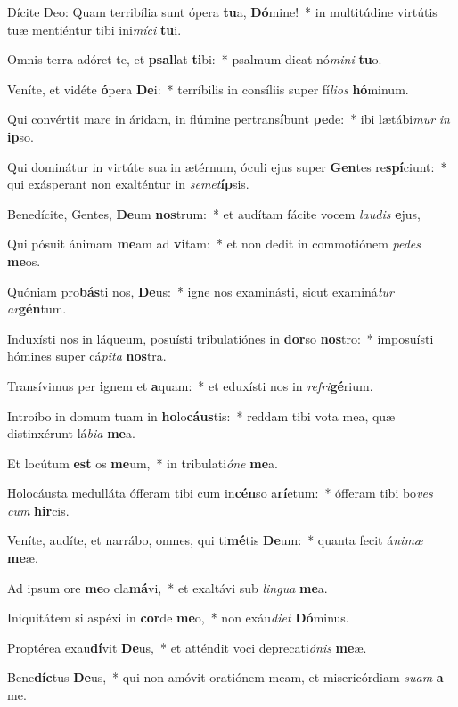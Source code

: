 \item Dícite Deo: Quam terribília sunt ópera \textbf{tu}a, \textbf{Dó}mine!~* in multitúdine virtútis tuæ mentiéntur tibi ini\textit{mí}\textit{ci} \textbf{tu}i.
\item Omnis terra adóret te, et \textbf{psal}lat \textbf{ti}bi:~* psalmum dicat nó\textit{mi}\textit{ni} \textbf{tu}o.
\item Veníte, et vidéte \textbf{ó}pera \textbf{De}i:~* terríbilis in consíliis super fí\textit{li}\textit{os} \textbf{hó}minum.
\item Qui convértit mare in áridam, in flúmine pertrans\textbf{í}bunt \textbf{pe}de:~* ibi lætábi\textit{mur} \textit{in} \textbf{ip}so.
\item Qui dominátur in virtúte sua in ætérnum, óculi ejus super \textbf{Gen}tes re\textbf{spí}ciunt:~* qui exásperant non exalténtur in \textit{se}\textit{met}\textbf{íp}sis.
\item Benedícite, Gentes, \textbf{De}um \textbf{nos}trum:~* et audítam fácite vocem \textit{lau}\textit{dis} \textbf{e}jus,
\item Qui pósuit ánimam \textbf{me}am ad \textbf{vi}tam:~* et non dedit in commotiónem \textit{pe}\textit{des} \textbf{me}os.
\item Quóniam pro\textbf{bás}ti nos, \textbf{De}us:~* igne nos examinásti, sicut examiná\textit{tur} \textit{ar}\textbf{gén}tum.
\item Induxísti nos in láqueum, posuísti tribulatiónes in \textbf{dor}so \textbf{nos}tro:~* imposuísti hómines super cá\textit{pi}\textit{ta} \textbf{nos}tra.
\item Transívimus per \textbf{i}gnem et \textbf{a}quam:~* et eduxísti nos in \textit{re}\textit{fri}\textbf{gé}rium.
\item Introíbo in domum tuam in \textbf{ho}lo\textbf{cáus}tis:~* reddam tibi vota mea, quæ distinxérunt lá\textit{bi}\textit{a} \textbf{me}a.
\item Et locútum \textbf{est} os \textbf{me}um,~* in tribulati\textit{ó}\textit{ne} \textbf{me}a.
\item Holocáusta medulláta ófferam tibi cum in\textbf{cén}so a\textbf{rí}etum:~* ófferam tibi bo\textit{ves} \textit{cum} \textbf{hir}cis.
\item Veníte, audíte, et narrábo, omnes, qui ti\textbf{mé}tis \textbf{De}um:~* quanta fecit á\textit{ni}\textit{mæ} \textbf{me}æ.
\item Ad ipsum ore \textbf{me}o cla\textbf{má}vi,~* et exaltávi sub \textit{lin}\textit{gua} \textbf{me}a.
\item Iniquitátem si aspéxi in \textbf{cor}de \textbf{me}o,~* non exáu\textit{di}\textit{et} \textbf{Dó}minus.
\item Proptérea exau\textbf{dí}vit \textbf{De}us,~* et atténdit voci deprecati\textit{ó}\textit{nis} \textbf{me}æ.
\item Bene\textbf{díc}tus \textbf{De}us,~* qui non amóvit oratiónem meam, et misericórdiam \textit{su}\textit{am} \textbf{a} me.

